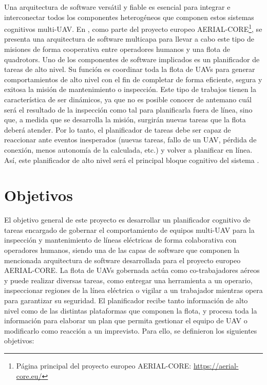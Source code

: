 \documentclass[fontsize=11pt, English=false, Español=true, Myfinal=true, twoside, numbers=noenddot]{scrbook}
\begin{document}
Una arquitectura de software versátil y fiable es esencial para integrar e interconectar todos los componentes heterogéneos que componen estos sistemas cognitivos multi-\gls{UAV}. En \cite{AerialCoreMulti-Layer}, como parte del proyecto europeo AERIAL-CORE\footnote{Página principal del proyecto europeo AERIAL-CORE: \url{https://aerial-core.eu/}}, se presenta una arquitectura de software multicapa para llevar a cabo este tipo de misiones de forma cooperativa entre operadores humanos y una flota de quadrotors. Uno de los componentes de software implicados es un planificador de tareas de alto nivel. Su función es coordinar toda la flota de \glspl{UAV} para generar comportamientos de alto nivel con el fin de completar de forma eficiente, segura y exitosa la misión de mantenimiento o inspección. Este tipo de trabajos tienen la característica de ser dinámicos, ya que no es posible conocer de antemano cuál será el resultado de la inspección como tal para planificarla fuera de línea, sino que, a medida que se desarrolla la misión, surgirán nuevas tareas que la flota deberá atender. Por lo tanto, el planificador de tareas debe ser capaz de reaccionar ante eventos inesperados (nuevas tareas, fallo de un \gls{UAV}, pérdida de conexión, menos autonomía de la calculada, etc.) y volver a planificar en línea. Así, este planificador de alto nivel será el principal bloque cognitivo del sistema \cite{AerialCoreMulti-Layer}.

\section{Objetivos}
\label{sec:Objectives}
El objetivo general de este proyecto es desarrollar un planificador cognitivo de tareas encargado de gobernar el comportamiento de equipos multi-\gls{UAV} para la inspección y mantenimiento de líneas eléctricas de forma colaborativa con operadores humanos, siendo una de las capas de software que componen la mencionada arquitectura de software \cite{AerialCoreMulti-Layer} desarrollada para el proyecto europeo AERIAL-CORE. La flota de \glspl{UAV} gobernada actúa como co-trabajadores aéreos y puede realizar diversas tareas, como entregar una herramienta a un operario, inspeccionar regiones de la línea eléctrica o vigilar a un trabajador mientras opera para garantizar su seguridad. El planificador recibe tanto información de alto nivel como de las distintas plataformas que componen la flota, y procesa toda la información para elaborar un plan que permita gestionar el equipo de \gls{UAV} o modificarlo como reacción a un imprevisto. Para ello, se definieron los siguientes objetivos:
\end{document}
